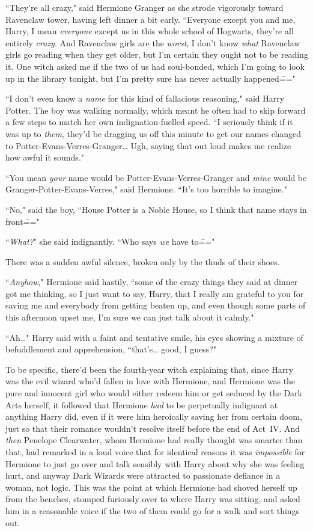 ``They're all crazy," said Hermione Granger as she strode vigorously toward Ravenclaw tower, having left dinner a bit early. ``Everyone except you and me, Harry, I mean \emph{everyone} except us in this whole school of Hogwarts, they're all entirely \emph{crazy}. And Ravenclaw girls are the \emph{worst}, I don't know \emph{what} Ravenclaw girls go reading when they get older, but I'm certain they ought not to be reading it. One witch asked me if the two of us had soul-bonded, which I'm going to look up in the library tonight, but I'm pretty sure has never actually happened\==="

``I don't even know a \emph{name} for this kind of fallacious reasoning," said Harry Potter. The boy was walking normally, which meant he often had to skip forward a few steps to match her own indignation-fuelled speed. ``I seriously think if it was up to \emph{them}, they'd be dragging us off this minute to get our names changed to Potter-Evans-Verres-Granger{\ldots} Ugh, saying that out loud makes me realize how awful it sounds."

``You mean \emph{your} name would be Potter-Evans-Verres-Granger and \emph{mine} would be Granger-Potter-Evans-Verres," said Hermione. ``It's too horrible to imagine."

``No," said the boy, ``House Potter is a Noble House, so I think that name stays in front\==="

``\emph{What?}" she said indignantly. ``Who says \emph{we} have to\==="

There was a sudden awful silence, broken only by the thuds of their shoes.

``\emph{Anyhow}," Hermione said hastily, ``some of the crazy things they said at dinner got me thinking, so I just want to say, Harry, that I really am grateful to you for saving me and everybody from getting beaten up, and even though some parts of this afternoon upset me, I'm sure we can just talk about it calmly."

``Ah{\ldots}" Harry said with a faint and tentative smile, his eyes showing a mixture of befuddlement and apprehension, ``that's{\ldots} good, I guess?"

To be specific, there'd been the fourth-year witch explaining that, since Harry was the evil wizard who'd fallen in love with Hermione, and Hermione was the pure and innocent girl who would either redeem him or get seduced by the Dark Arts herself, it followed that Hermione \emph{had} to be perpetually indignant at anything Harry did, even if it were him heroically saving her from certain doom, just so that their romance wouldn't resolve itself before the end of Act~IV. And \emph{then} Penelope Clearwater, whom Hermione had really thought was smarter than that, had remarked in a loud voice that for identical reasons it was \emph{impossible} for Hermione to just go over and talk sensibly with Harry about why she was feeling hurt, and anyway Dark Wizards were attracted to passionate defiance in a woman, not logic. This was the point at which Hermione had shoved herself up from the benches, stomped furiously over to where Harry was sitting, and asked him in a reasonable voice if the two of them could go for a walk and sort things out.


